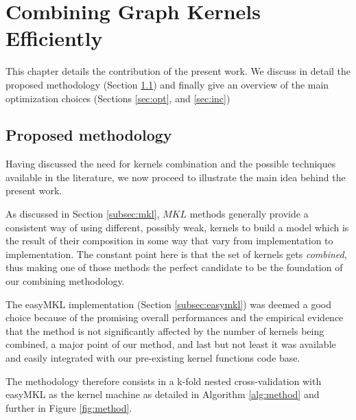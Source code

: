 \chapter{Combining Graph Kernels Efficiently}
\label{Chapter3}

This chapter details the contribution of the present work.
We discuss in detail the proposed methodology (Section \ref{sec:meth}) and
finally give an overview of the main optimization choices (Sections
\ref{sec:opt}, and \ref{sec:inc})

\section{Proposed methodology}
\label{sec:meth}

Having discussed the need for kernels combination and the possible techniques
available in the literature, we now proceed to illustrate the main idea behind
the present work.

As discussed in Section \ref{subsec:mkl}, $MKL$ methods generally provide a consistent
way of using different, possibly weak, kernels to build a model which is the result
of their composition in some way that vary from implementation to implementation.
The constant point here is that the set of kernels gets \emph{combined}, thus
making one of those methods the perfect candidate to be the foundation of our
combining methodology.

The easyMKL implementation (Section \ref{subsec:easymkl}) was deemed a good
choice because of the promising overall performances and the empirical evidence
that the method is not significantly affected by the number of kernels
being combined, a major point of our method, and last but not least it was
available and easily integrated with our pre-existing kernel functions code base.

The methodology therefore consists in a k-fold nested cross-validation with
easyMKL as the kernel machine as detailed in Algorithm \ref{alg:method} and further in
Figure \ref{fig:method}.

